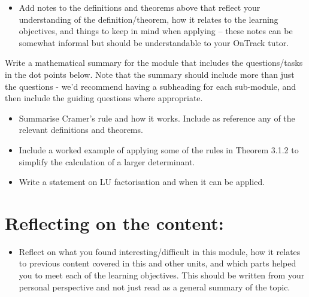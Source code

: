 \documentclass[
  12pt,
  a4paper,
]{article}
\begin{document}
\begin{itemize}
    \item Add notes to the definitions and theorems above that reflect your understanding of the definition/theorem, how it relates to the learning objectives, and things to keep in mind when applying – these notes can be somewhat informal but should be understandable to your OnTrack tutor. 
\end{itemize}
\noindent
Write a mathematical summary for the module that includes the questions/tasks in the dot points below. Note that the summary should include more than just the questions - we’d recommend having a subheading for each sub-module, and then include the guiding questions where appropriate. 
\begin{itemize}
    \item Summarise Cramer’s rule and how it works. Include as reference any of the relevant definitions and theorems.
    \item Include a worked example of applying some of the rules in Theorem 3.1.2 to simplify the calculation of a larger determinant.
    \item Write a statement on LU factorisation and when it can be applied. 
\end{itemize}


\section*{Reflecting on the content:}
\begin{itemize}
    \item Reflect on what you found interesting/difficult in this module, how it relates to previous content covered in this and other units, and which parts helped you to meet each of the learning objectives. This should be written from your personal perspective and not just read as a general summary of the topic.
\end{itemize}
\end{document}
